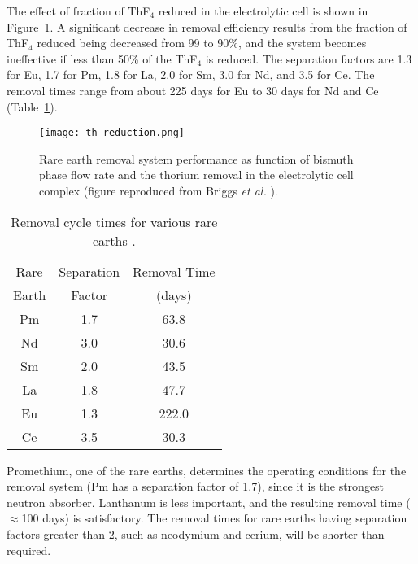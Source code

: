 The effect of fraction of ThF$_4$ reduced in the electrolytic cell is shown in Figure~\ref{fig:th-reduction}. A significant decrease in removal efficiency results from the fraction of ThF$_4$ reduced being decreased from 99 to 90\%, and the system becomes ineffective if less than 50\% of the ThF$_4$ is reduced.  The separation factors are 1.3 for Eu, 1.7 for Pm, 1.8 for La, 2.0 for Sm, 3.0 for Nd, and 3.5 for Ce. The removal times range from about 225 days for Eu to 30 days for Nd and Ce (Table~\ref{tab:removal_time}). 
\begin{figure}[htbp!]
  \centering
        \texttt{[image: th\_reduction.png]}
    \caption{Rare earth removal system performance as function of bismuth phase flow rate and the thorium removal in the electrolytic cell complex (figure reproduced from Briggs \emph{et al.} \cite{briggs_molten-salt_1969}).}
    \label{fig:th-reduction}
\end{figure}
\begin{table}[ht!]
\caption{Removal cycle times for various rare earths \cite{briggs_molten-salt_1969}.}
  \centering
\begin{tabular}{c c c}
\hline Rare  & Separation & Removal Time                        \\
       Earth & Factor     & (days)								\\
\hline Pm          & 1.7				& 63.8 					\\
\hline Nd		   & 3.0                & 30.6 					\\
\hline Sm		   & 2.0                & 43.5 					\\
\hline La		   & 1.8                & 47.7 					\\
\hline Eu		   & 1.3                & 222.0 				\\
\hline Ce		   & 3.5                & 30.3 					\\
\hline 
\end{tabular}
  		\label{tab:removal_time}
\end{table}

Promethium, one of the rare earths, determines the operating conditions for the removal system (Pm has a separation factor of 1.7), since it is the strongest neutron absorber. Lanthanum is less important, and the resulting removal time ($\approx$100 days) is satisfactory.
The removal times for rare earths having separation factors greater than 2, such 
as neodymium and cerium, will be shorter than required.

